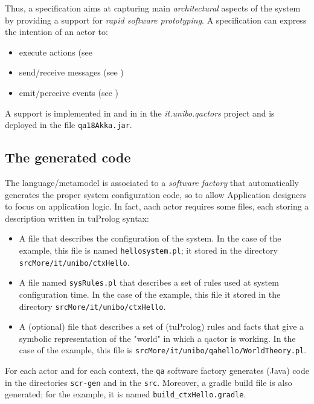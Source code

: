 Thus, a \qa{} specification aims at capturing main \textit{architectural} aspects of the system by providing a support for \textit{rapid software prototyping}. A \qa{} specification can express the intention of an actor to:
\begin{itemize}
\item execute actions (see 
\item send/receive messages (see )
\item emit/perceive events   (see )
\end{itemize}


A \qa{} support is implemented in \java{} and in \tuprolog{} in the \textit{it.unibo.qactors} project and is deployed in the file \texttt{qa18Akka.jar}.


\subsection{The generated code}

The \qa{} language/metamodel is associated to a \textit{software factory} that automatically generates the proper system configuration code, so to allow Application designers to focus on application logic.
In fact, aach actor requires some files, each storing a description written in tuProlog syntax:
\begin{itemize}
\item A file that describes the configuration of the system. In the case of the example, this file is named \texttt{hellosystem.pl}; it stored in the directory \texttt{srcMore/it/unibo/ctxHello}.
\item A file named \texttt{sysRules.pl} that describes a set of rules used at system configuration time. In the case of the example, this file it stored in the directory \texttt{srcMore/it/unibo/ctxHello}.
\item A (optional) file that describes a set of (tuProlog) rules and facts that give a symbolic representation of the "world" in which a qactor is working. In the case of the example, this file is \texttt{srcMore/it/unibo/qahello/WorldTheory.pl}.
\end{itemize}


For each actor and for each context, the \texttt{qa} software factory generates (Java) code in the directories \texttt{scr-gen} and in the \texttt{src}. Moreover, a gradle build file is also generated; for the example, it is named \texttt{build\_ctxHello.gradle}. 

